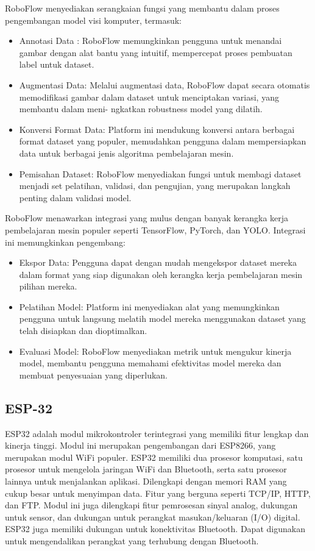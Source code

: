 RoboFlow menyediakan serangkaian fungsi yang membantu dalam proses pengembangan model visi komputer, termasuk:
\begin{itemize}
    \item Annotasi Data : RoboFlow memungkinkan pengguna untuk menandai gambar dengan alat bantu yang intuitif, mempercepat proses pembuatan label untuk dataset.
    \item Augmentasi Data: Melalui augmentasi data, RoboFlow dapat secara otomatis memodifikasi gambar dalam dataset untuk menciptakan variasi, yang membantu dalam meni- ngkatkan robustness model yang dilatih.
    \item Konversi Format Data: Platform ini mendukung konversi antara berbagai format dataset yang populer, memudahkan pengguna dalam mempersiapkan data untuk berbagai jenis algoritma pembelajaran mesin.
    \item Pemisahan Dataset: RoboFlow menyediakan fungsi untuk membagi dataset menjadi set pelatihan, validasi, dan pengujian, yang merupakan langkah penting dalam validasi model.
\end{itemize}
RoboFlow menawarkan integrasi yang mulus dengan banyak kerangka kerja pembelajaran mesin populer seperti TensorFlow, PyTorch, dan YOLO. Integrasi ini memungkinkan pengembang:
\begin{itemize}
    \item Ekspor Data: Pengguna dapat dengan mudah mengekspor dataset mereka dalam format yang siap digunakan oleh kerangka kerja pembelajaran mesin pilihan mereka.
    \item Pelatihan Model: Platform ini menyediakan alat yang memungkinkan pengguna untuk langsung melatih model mereka menggunakan dataset yang telah disiapkan dan dioptimalkan.
    \item Evaluasi Model: RoboFlow menyediakan metrik untuk mengukur kinerja model, membantu pengguna memahami efektivitas model mereka dan membuat penyesuaian yang diperlukan.
\end{itemize}


\subsection{ESP-32}
ESP32 adalah modul mikrokontroler terintegrasi yang memiliki fitur lengkap dan kinerja tinggi. Modul ini merupakan pengembangan dari ESP8266, yang merupakan modul WiFi populer. ESP32 memiliki dua prosesor komputasi, satu prosesor untuk mengelola jaringan WiFi dan Bluetooth, serta satu prosesor lainnya untuk menjalankan aplikasi. Dilengkapi dengan memori RAM yang cukup besar untuk menyimpan data. Fitur yang berguna seperti TCP/IP, HTTP, dan FTP. Modul ini juga dilengkapi fitur pemrosesan sinyal analog, dukungan untuk sensor, dan dukungan untuk perangkat masukan/keluaran (I/O) digital. ESP32 juga memiliki dukungan untuk konektivitas Bluetooth. Dapat digunakan untuk mengendalikan perangkat yang terhubung dengan Bluetooth.